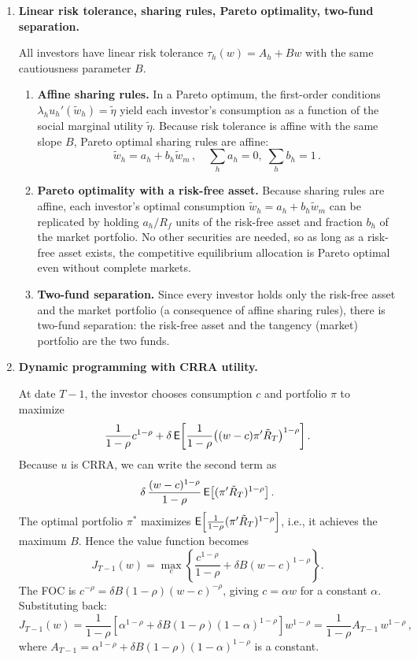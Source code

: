 \begin{enumerate}
\item \textbf{Linear risk tolerance, sharing rules, Pareto optimality, two-fund separation.}

All investors have linear risk tolerance $\tau_h(w) = A_h + Bw$ with the same cautiousness parameter $B$.

\begin{enumerate}
\item[(a)] \textbf{Affine sharing rules.}  In a Pareto optimum, the first-order conditions $\lambda_h u_h'(\tilde{w}_h) = \tilde{\eta}$ yield each investor's consumption as a function of the social marginal utility $\tilde{\eta}$.  Because risk tolerance is affine with the same slope $B$, Pareto optimal sharing rules are affine:
\[
\tilde{w}_h = a_h + b_h \tilde{w}_m\,,\quad \textstyle\sum_h a_h = 0,\;\sum_h b_h = 1\,.
\]

\item[(b)] \textbf{Pareto optimality with a risk-free asset.}  Because sharing rules are affine, each investor's optimal consumption $\tilde{w}_h = a_h + b_h\tilde{w}_m$ can be replicated by holding $a_h/R_f$ units of the risk-free asset and fraction $b_h$ of the market portfolio.  No other securities are needed, so as long as a risk-free asset exists, the competitive equilibrium allocation is Pareto optimal even without complete markets.

\item[(c)] \textbf{Two-fund separation.}  Since every investor holds only the risk-free asset and the market portfolio (a consequence of affine sharing rules), there is two-fund separation: the risk-free asset and the tangency (market) portfolio are the two funds.
\end{enumerate}

\item \textbf{Dynamic programming with CRRA utility.}

At date $T-1$, the investor chooses consumption $c$ and portfolio $\pi$ to maximize
\[
\frac{1}{1-\rho}c^{1-\rho} + \delta\,\mathsf{E}\!\left[\frac{1}{1-\rho}\big((w-c)\pi'\tilde{R}_T\big)^{1-\rho}\right].
\]
Because $u$ is CRRA, we can write the second term as
\[
\delta\,\frac{(w-c)^{1-\rho}}{1-\rho}\,\mathsf{E}\!\left[(\pi'\tilde{R}_T)^{1-\rho}\right].
\]
The optimal portfolio $\pi^*$ maximizes $\mathsf{E}\!\left[\frac{1}{1-\rho}(\pi'\tilde{R}_T)^{1-\rho}\right]$, i.e., it achieves the maximum $B$.  Hence the value function becomes
\[
J_{T-1}(w) = \max_c\left\{\frac{c^{1-\rho}}{1-\rho} + \delta B(w-c)^{1-\rho}\right\}.
\]
The FOC is $c^{-\rho} = \delta B(1-\rho)(w-c)^{-\rho}$, giving $c = \alpha w$ for a constant $\alpha$.  Substituting back:
\[
J_{T-1}(w) = \frac{1}{1-\rho}\left[\alpha^{1-\rho} + \delta B(1-\rho)(1-\alpha)^{1-\rho}\right]w^{1-\rho} = \frac{1}{1-\rho}A_{T-1}\,w^{1-\rho}\,,
\]
where $A_{T-1} = \alpha^{1-\rho} + \delta B(1-\rho)(1-\alpha)^{1-\rho}$ is a constant.


\end{enumerate}
